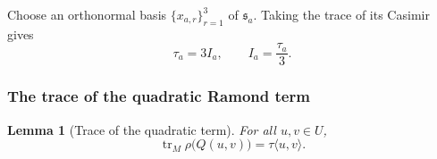 \documentclass[11pt,reqno]{amsart}
\newtheorem{lemma}[theorem]{Lemma}
\theoremstyle{definition}
\theoremstyle{remark}
\begin{document}
Choose an orthonormal basis \(\{x_{a,r}\}_{r=1}^3\) of
\(\mathfrak s_a\).  Taking the trace of its Casimir gives
\begin{equation}
  \tau_a=3I_a,
  \qquad
  I_a=\frac{\tau_a}{3}.
  \label{d4:eq:D4-index-Casimir-trace-relation}
\end{equation}

\subsubsection{The trace of the quadratic Ramond term}


\begin{lemma}[Trace of the quadratic term]
\label{d4:lem:D4-trace-quadratic-Ramond-term}
For all \(u,v\in U\),
\begin{equation}
  \operatorname{tr}_M\rho\bigl(Q(u,v)\bigr)
  =\tau\langle u,v\rangle.
  \label{d4:eq:D4-trace-quadratic-Ramond-term}
\end{equation}
\end{lemma}
\end{document}
